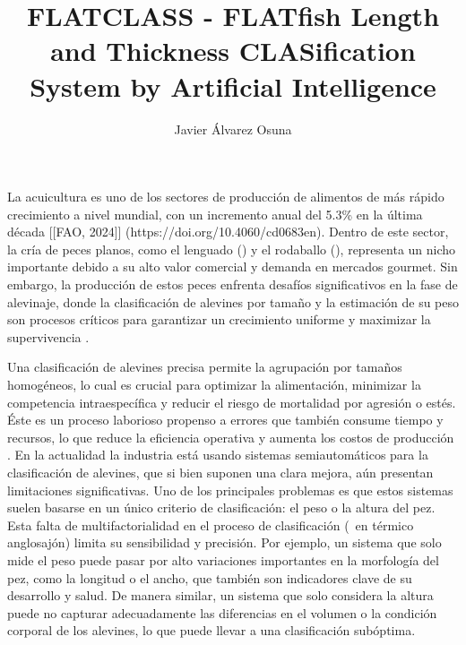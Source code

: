 \documentclass[a4paper,10pt,spanish]{jupyterBook}
\title{FLATCLASS - FLATfish Length and Thickness CLASification System by Artificial Intelligence}
\date{}
\author{Javier Álvarez Osuna}
\begin{document}
\pagestyle{empty}
\sphinxmaketitle
\pagestyle{plain}
\sphinxtableofcontents
\pagestyle{normal}
\label{\detokenize{content/intro::doc}}


\sphinxAtStartPar
La acuicultura es uno de los sectores de producción de alimentos de más rápido crecimiento a nivel mundial, con un incremento anual del 5.3\% en la última década {[}{[}FAO, 2024{]}{]} (https://doi.org/10.4060/cd0683en). Dentro de este sector, la cría de peces planos, como el lenguado () y el rodaballo (), representa un
nicho importante debido a su alto valor comercial y demanda en mercados gourmet. Sin embargo, la producción de estos peces enfrenta desafíos significativos en la fase de alevinaje, donde la clasificación
de alevines por tamaño y la estimación de su peso son procesos críticos para garantizar un crecimiento uniforme y maximizar la supervivencia .

\sphinxAtStartPar
Una clasificación de alevines precisa permite la agrupación por tamaños homogéneos, lo cual es crucial para optimizar la alimentación, minimizar la competencia intraespecífica y reducir el riesgo de mortalidad por agresión o estés. Éste es un proceso laborioso propenso a errores que también consume tiempo y recursos, lo que reduce la eficiencia operativa y aumenta los costos de producción . En la actualidad la industria está usando sistemas semi\sphinxhyphen{}automáticos para la clasificación de alevines, que si bien suponen una clara mejora, aún presentan limitaciones significativas. Uno de los principales problemas es que estos sistemas suelen basarse en un único criterio de clasificación: el peso o la altura del pez. Esta falta de multifactorialidad en el proceso de clasificación ( en térmico anglosajón) limita su sensibilidad y precisión. Por ejemplo, un sistema que solo mide el peso puede pasar por alto variaciones importantes en la morfología del pez, como la longitud o el ancho, que también son indicadores clave de su desarrollo y salud. De manera similar, un sistema que solo considera la altura puede no capturar adecuadamente las diferencias en el volumen o la condición corporal de los alevines, lo que puede llevar a una clasificación subóptima.
\end{document}
